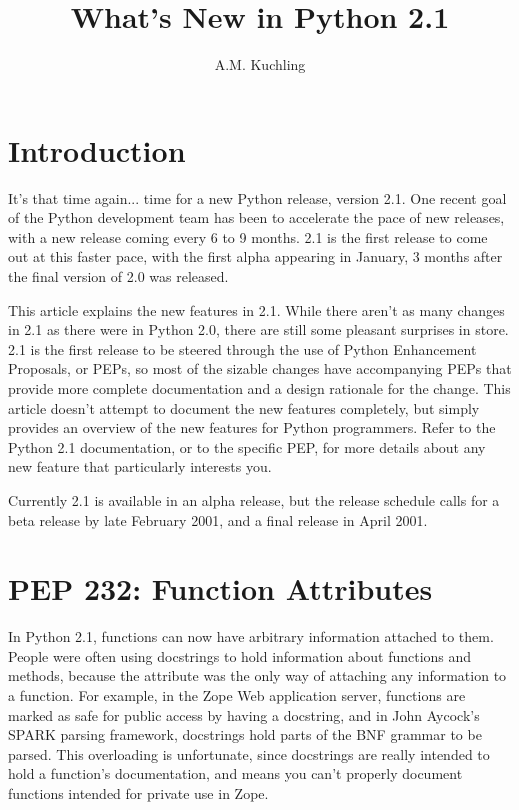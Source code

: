 \documentclass{howto}
\title{What's New in Python 2.1}
\author{A.M. Kuchling}
\begin{document}
\maketitle\tableofcontents

\section{Introduction}

It's that time again... time for a new Python release, version 2.1.
One recent goal of the Python development team has been to accelerate
the pace of new releases, with a new release coming every 6 to 9
months. 2.1 is the first release to come out at this faster pace, with
the first alpha appearing in January, 3 months after the final version
of 2.0 was released.

This article explains the new features in 2.1.  While there aren't as
many changes in 2.1 as there were in Python 2.0, there are still some
pleasant surprises in store.  2.1 is the first release to be steered
through the use of Python Enhancement Proposals, or PEPs, so most of
the sizable changes have accompanying PEPs that provide more complete
documentation and a design rationale for the change.  This article
doesn't attempt to document the new features completely, but simply
provides an overview of the new features for Python programmers.
Refer to the Python 2.1 documentation, or to the specific PEP, for
more details about any new feature that particularly interests you.

Currently 2.1 is available in an alpha release, but the release
schedule calls for a beta release by late February 2001, and a final
release in April 2001.

\section{PEP 232: Function Attributes}

In Python 2.1, functions can now have arbitrary
information attached to them.  People were often using docstrings to hold
information about functions and methods, because the 
attribute was the only way of attaching any information to a function.
For example, in the Zope Web application server, functions are marked
as safe for public access by having a docstring, and in John Aycock's
SPARK parsing framework, docstrings hold parts of the BNF grammar to
be parsed.  This overloading is unfortunate, since docstrings are
really intended to hold a function's documentation, and means you
can't properly document functions intended for private use in Zope.
\end{document}
